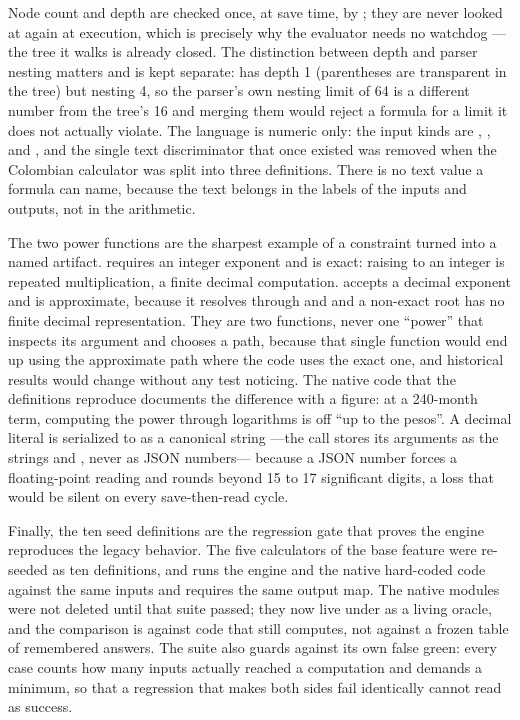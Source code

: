 Node count and depth are checked once, at save time, by ; they are never
looked at again at execution, which is precisely why the evaluator needs no watchdog —the tree it
walks is already closed. The distinction between depth and parser nesting matters and is kept
separate:  has depth 1 (parentheses are transparent in the tree) but nesting 4,
so the parser's own nesting limit of 64 is a different number from the tree's 16 and merging them
would reject a formula for a limit it does not actually violate. The language is numeric only: the
input kinds are , , and , and the single text discriminator
that once existed was removed when the Colombian calculator was split into three definitions.
There is no text value a formula can name, because the text belongs in the labels of the inputs
and outputs, not in the arithmetic.

The two power functions are the sharpest example of a constraint turned into a named artifact.
 requires an integer exponent and is exact: raising to an integer is repeated
multiplication, a finite decimal computation.  accepts a decimal exponent and
is approximate, because it resolves through  and  and a non-exact root has no
finite decimal representation. They are two functions, never one \enquote{power} that inspects its
argument and chooses a path, because that single function would end up using the approximate path
where the code uses the exact one, and historical results would change without any test noticing.
The native code that the definitions reproduce documents the difference with a figure: at a
240-month term, computing the power through logarithms is off \enquote{up to the pesos}. A decimal
literal is serialized to  as a canonical string —the call  stores
its arguments as the strings  and , never as JSON numbers— because a JSON
number forces a floating-point reading and  rounds beyond 15 to 17 significant
digits, a loss that would be silent on every save-then-read cycle.

Finally, the ten seed definitions are the regression gate that proves the engine reproduces the
legacy behavior. The five calculators of the base feature were re-seeded as ten definitions, and
 runs the engine and the native hard-coded code against the same
inputs and requires the same output map. The native modules were not deleted until that suite
passed; they now live under  as a living oracle, and the comparison is against
code that still computes, not against a frozen table of remembered answers. The suite also guards
against its own false green: every case counts how many inputs actually reached a computation and
demands a minimum, so that a regression that makes both sides fail identically cannot read as
success.

